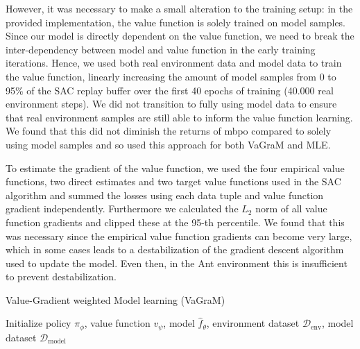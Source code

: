 However, it was necessary to make a small alteration to the training setup: in the provided implementation, the value function is solely trained on model samples.
Since our model is directly dependent on the value function, we need to break the inter-dependency between model and value function in the early training iterations.
Hence, we used both real environment data and model data to train the value function, linearly increasing the amount of model samples from 0 to 95\% of the SAC replay buffer over the first 40 epochs of training (40.000 real environment steps).
We did not transition to fully using model data to ensure that real environment samples are still able to inform the value function learning.
We found that this did not diminish the returns of \ac{mbpo} compared to solely using model samples and so used this approach for both VaGraM and MLE.

To estimate the gradient of the value function, we used the four empirical value functions, two direct estimates and two target value functions used in the SAC algorithm and summed the losses using each data tuple and value function gradient independently.
Furthermore we calculated the $L_2$ norm of all value function gradients and clipped these at the 95-th percentile.
We found that this was necessary since the empirical value function gradients can become very large, which in some cases leads to a destabilization of the gradient descent algorithm used to update the model.
Even then, in the Ant environment this is insufficient to prevent destabilization.


\begin{algorithm}[t]
\caption{Value-Gradient weighted Model learning (VaGraM)}\label{alg:vambpo}
Initialize policy $\pi_\phi$, value function $v_\psi$, model $\hat{f}_\theta$, environment dataset $\mathcal{D}_\text{env}$, model dataset $\mathcal{D}_\text{model}$\;
{
}
\end{algorithm}

